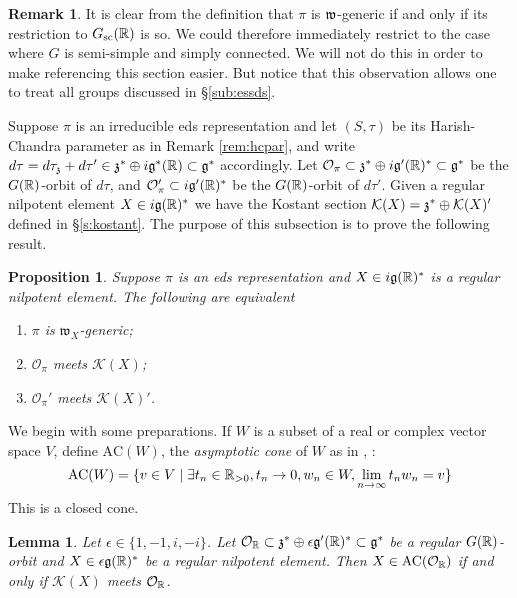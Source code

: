 \documentclass{article}
\newtheorem{lem}[thm]{Lemma}
\newtheorem{pro}[thm]{Proposition}
\theoremstyle{definition}
\newtheorem{rem}[thm]{Remark}
\numberwithin{equation}{section}
\renewcommand{\-}{\hyp{}}
\newcommand{\g}{\mathfrak g}
\renewcommand{\O}{\mathcal O}
\newcommand{\K}{\mathcal K}
\newcommand{\w}{\mathfrak w}
\newcommand{\AC}{\mathrm{AC}}
\begin{document}
\begin{rem}
	It is clear from the definition that $\pi$ is $\mathfrak{w}$-generic if and only if its restriction to $G_{\textrm{sc}}(\mathbb{R})$ is so. We could therefore immediately restrict to the case where $G$ is semi-simple and simply connected. We will not do this in order to make referencing this section easier. But notice that this observation allows one to treat all groups discussed in \S\ref{sub:essds}.
\end{rem}

Suppose $\pi$ is an irreducible eds representation and let $(S,\tau)$ be its Harish-Chandra parameter as in Remark  \ref{rem:hcpar}, and write $d\tau=d\tau_\mf{z}+d\tau' \in \mf{z}^* \oplus i\mf{g}^*(\R) \subset \g^*$ accordingly. Let $\O_\pi \subset \mf{z}^* \oplus i\mf{g}'(\R)^* \subset \mf{g}^*$ be the $G(\mathbb{R})$-orbit of $d\tau$, and $\O_\pi' \subset i\g'(\R)^*$ be the $G(\mathbb{R})$-orbit of $d\tau'$. Given a regular nilpotent element $X\in i\g(\R)^*$ we have the Kostant section $\K(X) = \mf{z}^* \oplus \K(X)'$ defined in \S\ref{s:kostant}. The purpose of this subsection is to prove the following result.

\begin{pro}
  \label{p:whittaker}
Suppose $\pi$ is an eds representation and $X\in i\g(\R)^*$ is a regular nilpotent element. The following are equivalent
\begin{enumerate}
	\item $\pi$ is $\w_X$-generic;
 	\item $\O_\pi$ meets $\K(X)$;
  	\item $\O_\pi'$ meets $\K(X)'$.
\end{enumerate}
\end{pro}

We begin with some preparations. If $W$ is a subset of a real or complex vector space $V$, define  $\AC(W)$,  the  {\it asymptotic cone} of $W$ as in   \cite[Proposition 3.7]{bvlocal}, \cite[Definition 2.9]{avav}:
$$
\AC(W)=\{v\in V\mid \exists t_n\in \R_{>0},t_n\rightarrow 0,w_n\in W,\lim_{n\rightarrow\infty}t_n w_n=v\}
$$
This is a closed cone. 

\begin{lem} \label{lem:g1}
  Let $\epsilon \in \{1,-1,i,-i\}$. Let $\O_\R\subset \mf{z}^* \oplus \epsilon\g'(\R)^* \subset \g^*$ be a regular $G(\mathbb{R})$-orbit and $X\in \epsilon\g(\R)^*$ be a regular nilpotent element.
Then  $X\in \AC(\O_\R)$ if and only if $\K(X)$ meets $\O_\R$.
\end{lem}
\end{document}
